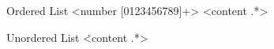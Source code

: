 \begin{identifier}{Ordered List}
<number [0123456789]+> <content .*>
\end{identifier}
\begin{identifier}{Unordered List}
\. <content .*>
\end{identifier}

